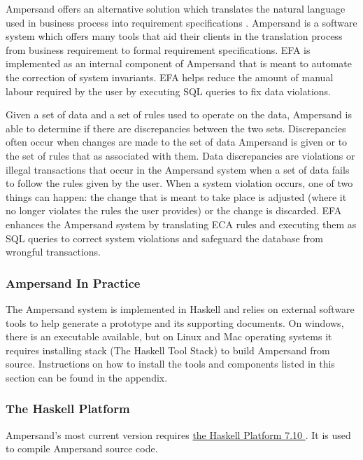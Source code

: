 \documentclass[journal,12pt,onecolumn,draftclsnofoot]{article}
\let\Oldsubsubsection\subsubsection
\renewcommand{\subsubsection}{\FloatBarrier\Oldsubsubsection}
\begin{document}
Ampersand offers an alternative solution which translates the natural language 
used in business process into requirement specifications \cite{ruledesign}. 
Ampersand is a 
software system which offers many tools that aid their clients in the 
translation process from business requirement to formal requirement 
specifications. EFA is implemented as an internal component of Ampersand that 
is meant to automate the correction of system invariants. EFA helps reduce the 
amount of manual labour required by the user by executing SQL queries to fix 
data violations. %

Given a set of data and a set of rules used to operate on the data, Ampersand 
is able to determine if there are discrepancies between the two sets. 
Discrepancies often occur when changes are made to the set of data Ampersand is 
given or to the set of rules that as associated with them. Data discrepancies 
are violations or illegal transactions that occur in the Ampersand system when 
a set of data fails to follow the rules given by the user. When a system 
violation occurs, one of two things can happen: the change that is meant to 
take place is adjusted (where it no longer violates the rules the user 
provides) or the change is discarded. EFA enhances the Ampersand system by 
translating ECA rules and executing them as SQL queries to correct system 
violations and safeguard the database from wrongful transactions.

\subsubsection{Ampersand In Practice}

The Ampersand system is implemented in Haskell and relies on external software 
tools to help generate a prototype and its supporting documents. On windows, 
there is an executable available, but on Linux and Mac operating systems it 
requires installing stack (The Haskell Tool Stack) to build Ampersand from 
source. 
Instructions on how to install the tools and components listed in this section 
can be found in the appendix.

\subsubsection*{The Haskell Platform}
\noindent
Ampersand's most current version requires 
\href{https://www.haskell.org/platform/}{the Haskell Platform 7.10 }. It is 
used to compile Ampersand source code.
\end{document}
